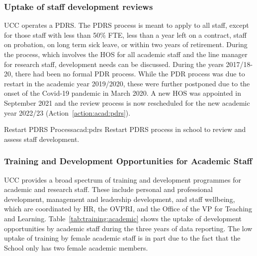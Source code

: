 \subsubsection{Uptake of staff development reviews}

UCC operates a \ac{PDRS}. The PDRS process is meant to apply to all staff, except for those staff with less than 50\% FTE, less than a year left on a contract, staff on probation, on long term sick leave, or within two years of retirement. During the process, which involves the \ac{HOS} for all academic staff and the line manager for research staff, development needs can be discussed. During the years 2017/18-20, there had been no formal PDR process. While the PDR process was due to restart in the academic year 2019/2020, these were further postponed due to the onset of the Covid-19 pandemic in March 2020. A new \ac{HOS} was appointed in September 2021 and the review process is now rescheduled for the new academic year 2022/23 (Action~\ref{action:acad:pdrs}).


\newcommand{\actacadpdrs}{%
Restart PDRS process in school to review and assess staff development.}
\begin{actionblock}{\ksspace{}Restart PDRS Process}{acad:pdrs}
\actacadpdrs
\hfill{
    \hypersetup{hidelinks}
    \hyperlink{c13}{\gotoactionsymbol{}}
}
\end{actionblock}


\subsubsection{Training and Development Opportunities for Academic Staff}
UCC provides a broad spectrum of training and development programmes for academic and research staff. These include personal and professional development, management and leadership development, and staff wellbeing, which are coordinated by HR, the \ac{OVPRI}, and the Office of the VP for Teaching and Learning. 
Table~\ref{tab:training:academic} 
shows the uptake of development opportunities by academic staff during the three years of data reporting. The low uptake of training by female academic staff is in part due to the fact that the School only has two female academic members. 

